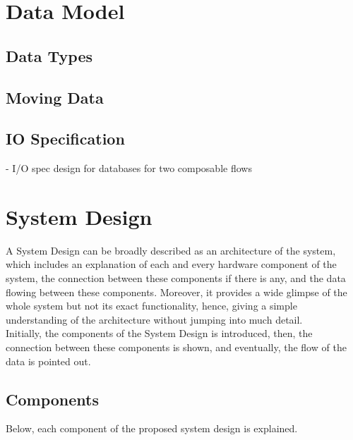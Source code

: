 \fi


\newpage



\section{Data Model}

\subsection{Data Types}


\subsection{Moving Data}

\subsection{IO Specification}
- I/O spec design for databases for two composable flows


\section{System Design }
A System Design can be broadly described as an architecture of the system, which includes an explanation of each and every hardware component of the system, the connection between these components if there is any, and the data flowing between these components. Moreover, it provides a wide glimpse of the whole system but not its exact functionality, hence, giving a simple understanding of the architecture without jumping into much detail.\\
Initially, the components of the System Design is introduced, then, the connection between these components is shown, and eventually, the flow of the data is pointed out.

\subsection{Components}
\label{sub:components}
Below, each component of the proposed system design is explained.

